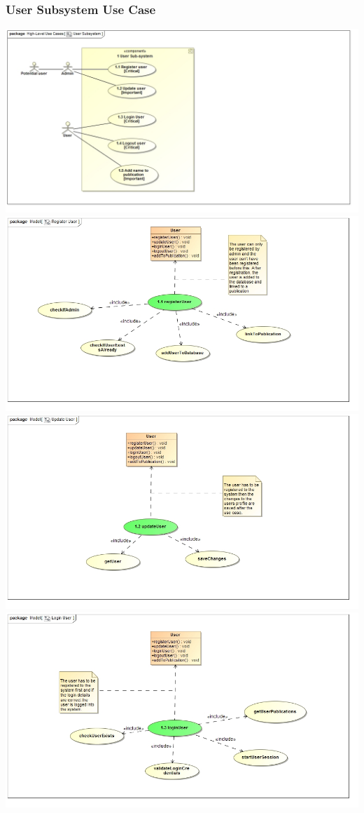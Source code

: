 \documentclass{article}
\begin{document}
			\subsubsection{User Subsystem Use Case}
				\includegraphics[width=\textwidth]{UserSubsystem}
				\includegraphics[width=\textwidth]{RegisterUser}
				\includegraphics[width=\textwidth]{UpdateUser}
				\includegraphics[width=\textwidth]{LoginUser}
\end{document}
